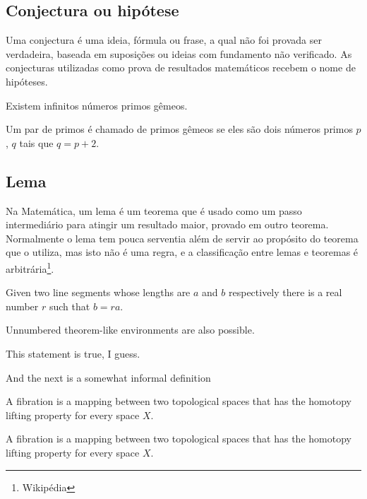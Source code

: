 \subsection{Conjectura ou hipótese}

Uma conjectura é uma ideia, fórmula ou frase, a qual não foi provada ser verdadeira, baseada em suposições ou ideias com fundamento não verificado. As conjecturas utilizadas como prova de resultados matemáticos recebem o nome de hipóteses.



\begin{conjectura}	
	Existem infinitos números primos gêmeos.
\end{conjectura}

Um par de primos é chamado de primos gêmeos se eles são dois números primos $p$, $q$ tais que $q = p + 2$.



\subsection{Lema}

Na Matemática, um lema é um teorema que é usado como um passo intermediário para atingir um resultado maior, provado em outro teorema. Normalmente o lema tem pouca serventia além de servir ao propósito do teorema que o utiliza, mas isto não é uma regra, e a classificação entre lemas e teoremas é arbitrária\footnote{Wikipédia}.


\begin{lema}	
	Given two line segments whose lengths are $a$ and $b$ respectively there is a 
	real number $r$ such that $b=ra$.
\end{lema}



Unnumbered theorem-like environments are also possible.

\begin{observacao}
	This statement is true, I guess.
\end{observacao}

And the next is a somewhat informal definition


\begin{definicao}[Fibration]
	A fibration is a mapping between two topological spaces that has the homotopy lifting property for every space $X$.
\end{definicao}

\begin{exemplo}[Fibration]
	A fibration is a mapping between two topological spaces that has the homotopy lifting property for every space $X$.
\end{exemplo}


